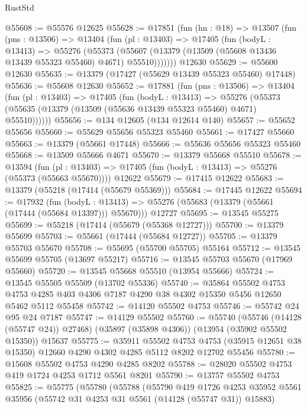 \begin{lexlean}{RustStd}
\begin{coremodule}
@55608 := @55576 @12625
@55628 := @17851
    (fun (hn : @18) =>
    @13507
      (fun (pns : @13506) =>
      @13404
        (fun (pl : @13403) =>
        @17405
          (fun (bodyL : @13413) =>
          @55276
            (@55373
              (@55607 (@13379 (@13509 (@55608 @13436 @13439 @55323 @55460) @4671) @55510)))))))
    @12630
@55629 := @55600 @12630
@55635 := @13379 (@17427 (@55629 @13439 @55323 @55460) @17448)
@55636 := @55608 @12630
@55652 := @17881
    (fun (pns : @13506) =>
    @13404
      (fun (pl : @13403) =>
      @17405
        (fun (bodyL : @13413) =>
        @55276 (@55373 (@55635 (@13379 (@13509 (@55636 @13439 @55323 @55460) @4671) @55510))))))
@55656 := @134 @12605 (@134 @12614 @140)
@55657 := @55652 @55656
@55660 := @55629 @55656 @55323 @55460
@55661 := @17427 @55660
@55663 := @13379 (@55661 @17448)
@55666 := @55636 @55656 @55323 @55460
@55668 := @13509 @55666 @4671
@55670 := @13379 @55668 @55510
@55678 := @13594
    (fun (pl : @13403) => @17405 (fun (bodyL : @13413) => @55276 (@55373 (@55663 @55670))))
    @12622
@55679 := @17415 @12622
@55683 := @13379 (@55218 (@17414 (@55679 @55369)))
@55684 := @17445 @12622
@55694 := @17932
    (fun (bodyL : @13413) => @55276 (@55683 (@13379 (@55661 (@17444 (@55684 @13397))) @55670)))
    @12727
@55695 := @13545 @55275
@55699 := @55218 (@17414 (@55679 (@55368 @12727)))
@55700 := @13379 @55699
@55703 := @55661 (@17444 (@55684 @12727))
@55705 := @13379 @55703 @55670
@55708 := @55695 (@55700 @55705) @55164
@55712 := @13545 @55699 @55705 (@13697 @55217)
@55716 := @13545 @55703 @55670 (@17969 @55660)
@55720 := @13545 @55668 @55510 (@13954 @55666)
@55724 := @13545 @55505 @55509 (@13702 @55336)
@55740 := @35864
    @55502
    @4753
    @4753
    @4285
    @403
    @4306
    @7187
    @4290
    @38
    @4302
    @15350
    @5456
    @12650
    @5462
    @5112
    @55458
@55742 := @14120 @55502 @4753
@55746 := @55742 @24 @95 @24 @7187
@55747 := @14129 @55502
@55760 := @55740
    (@55746 (@14128 (@55747 @24)) @27468)
    (@35897 (@35898 @4306))
    (@13954 (@35902 @55502 @15350))
    @15637
@55775 := @35911
    @55502
    @4753
    @4753
    (@35915 @12651 @38 @15350)
    @12660
    @4290
    @4302
    @4285
    @5112
    @8202
    @12702
    @55456
@55780 := @15608 @55502 @4753 @4290 @4285 @8202
@55788 := @28020 @55502 @4753 @419 @1724 @4253 @1712 @5561 @8201
@55790 := @13757 @55502 @4753
@55825 := @55775
    (@55780
      (@55788
        (@55790
          @419
          @1726
          @4253
          @35952
          @5561
          @35956
          (@55742 @31 @4253 @31 @5561 (@14128 (@55747 @31)) @15883)

\end{coremodule}
\end{lexlean}
